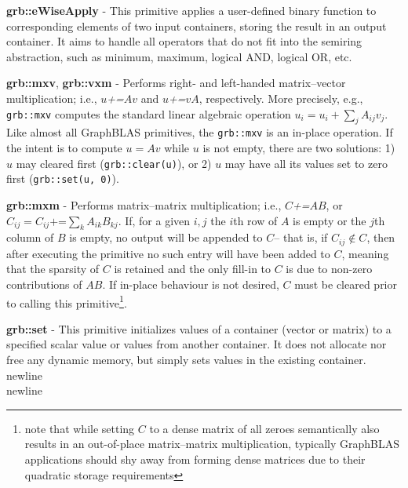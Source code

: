     \textbf{grb::eWiseApply} - This primitive applies a user-defined binary function to corresponding elements of two input containers, storing the result in an output container. 
    It aims to handle all operators that do not fit into the semiring abstraction, such as minimum, maximum, logical AND, logical OR, etc.\newline

    \textbf{grb::mxv}, \textbf{grb::vxm} - Performs right- and left-handed matrix--vector multiplication; i.e., $u$\textit{+=}$Av$ and $u$\textit{+=}$vA$, respectively. More precisely, e.g., \texttt{grb::mxv} computes the standard linear algebraic operation $u_i = u_i + \sum_j A_{ij} v_j$. 
    Like almost all GraphBLAS primitives, the \texttt{grb::mxv} is an in-place operation. 
    If the intent is to compute $u=Av$ while $u$ is not empty, there are two solutions: 1) $u$ may cleared first (\texttt{grb::clear(u)}), or 2) $u$ may have all its values set to zero first (\texttt{grb::set(u, 0)}).\newline

    \textbf{grb::mxm} - Performs matrix--matrix multiplication; i.e., $C$\textit{+=}$AB$, or $C_{ij}=C_{ij}\textit{+=}\sum_{k}A_{ik}B_{kj}$. If, for a given $i,j$ the $i$th row of $A$ is empty or the $j$th column of $B$ is empty, no output will be appended to $C$-- that is, if $C_{ij}\notin C$, then after executing the primitive no such entry will have been added to $C$, meaning that the sparsity of $C$ is retained and the only fill-in to $C$ is due to non-zero contributions of $AB$. If in-place behaviour is not desired, $C$ must be cleared prior to calling this primitive\footnote{note that while setting $C$ to a dense matrix of all zeroes semantically also results in an out-of-place matrix--matrix multiplication, typically GraphBLAS applications should shy away from forming dense matrices due to their quadratic storage requirements}.\newline

    \textbf{grb::set} - This primitive initializes values of a container (vector or matrix) to a specified scalar value or values from another container. 
    It does not allocate nor free any dynamic memory, but simply sets values in the existing container. \\ newline \\ newline

